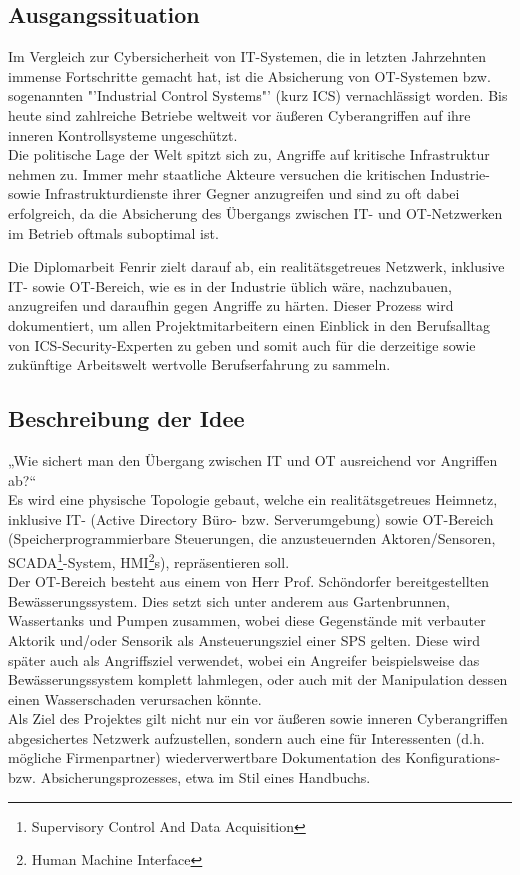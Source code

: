 \documentclass[
	headings=optiontotocandhead,%
	oneside,
	numbers=noenddot,%
	toc=flat, %
	10pt, %
	parskip=full, %
	listof=totoc, %
	listof=flat, %
	numbers=noenddot, %
	bibliography=totoc, %
	a4paper,DIV=14,
]{scrartcl}
\begin{document}
\subsection{Ausgangssituation}
Im Vergleich zur Cybersicherheit von IT-Systemen, die in letzten Jahrzehnten immense Fortschritte gemacht hat, ist die Absicherung von OT-Systemen bzw. sogenannten "'Industrial Control Systems"' (kurz ICS) vernachlässigt worden. Bis heute sind zahlreiche Betriebe weltweit vor äußeren Cyberangriffen auf ihre inneren Kontrollsysteme ungeschützt. \\
Die politische Lage der Welt spitzt sich zu, Angriffe auf kritische Infrastruktur nehmen zu. Immer mehr staatliche Akteure versuchen die kritischen Industrie- sowie Infrastrukturdienste ihrer Gegner anzugreifen und sind zu oft dabei erfolgreich, da die Absicherung des Übergangs zwischen IT- und OT-Netzwerken im Betrieb oftmals suboptimal ist.

Die Diplomarbeit Fenrir zielt darauf ab, ein realitätsgetreues Netzwerk, inklusive IT- sowie OT-Bereich, wie es in der Industrie üblich wäre, nachzubauen, anzugreifen und daraufhin gegen Angriffe zu härten. Dieser Prozess wird dokumentiert, um allen Projektmitarbeitern einen Einblick in den Berufsalltag von ICS-Security-Experten zu geben und somit auch für die derzeitige sowie zukünftige Arbeitswelt wertvolle Berufserfahrung zu sammeln.

\subsection{Beschreibung der Idee}
„Wie sichert man den Übergang zwischen IT und OT ausreichend vor Angriffen ab?“ \\
Es wird eine physische Topologie gebaut, welche ein realitätsgetreues Heimnetz, inklusive IT- (Active Directory Büro- bzw. Serverumgebung) sowie OT-Bereich (Speicherprogrammierbare Steuerungen, die anzusteuernden Aktoren/Sensoren, SCADA\footnote{Supervisory Control And Data Acquisition}-System, HMI\footnote{Human Machine Interface}s), repräsentieren soll. \\
Der OT-Bereich besteht aus einem von Herr Prof. Schöndorfer bereitgestellten Bewässerungssystem. Dies setzt sich unter anderem aus Gartenbrunnen, Wassertanks und Pumpen zusammen, wobei diese Gegenstände mit verbauter Aktorik und/oder Sensorik als Ansteuerungsziel einer SPS gelten. Diese wird später auch als Angriffsziel verwendet, wobei ein Angreifer beispielsweise das Bewässerungssystem komplett lahmlegen, oder auch mit der Manipulation dessen einen Wasserschaden verursachen könnte. \\
Als Ziel des Projektes gilt nicht nur ein vor äußeren sowie inneren Cyberangriffen abgesichertes Netzwerk aufzustellen, sondern auch eine für Interessenten (d.h. mögliche Firmenpartner) wiederverwertbare Dokumentation des Konfigurations- bzw. Absicherungsprozesses, etwa im Stil eines Handbuchs.
\end{document}
